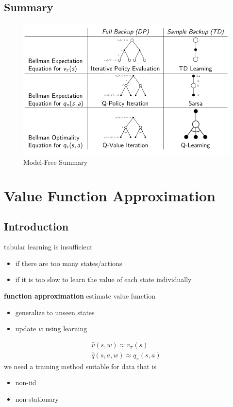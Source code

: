 \documentclass[]{article}
\theoremstyle{definition}
\begin{document}
\subsection{Summary}%
\label{sub:model_free_summary}

\begin{figure}[ht]
    \centering
    \includegraphics[width=0.7\linewidth]{model-free-summary.png}
    \caption{Model-Free Summary}
    \label{fig:model-free-summary}
\end{figure}

\section{Value Function Approximation}%
\label{sec:value_function_approximation}

\subsection{Introduction}%
\label{sub:vfa_introduction}
tabular learning is insufficient
\begin{itemize}
    \item if there are too many states/actions
    \item if it is too slow to learn the value of each state individually
\end{itemize}
\textbf{function approximation} estimate value function
\begin{itemize}
    \item generalize to unseen states
    \item update $w$ using learning
\end{itemize}
\begin{align*}
    \hat v(s,w) \approx v_\pi(s) \\
    \hat q(s, a, w) \approx q_\pi(s,a)
\end{align*}
we need a training method suitable for data that is
\begin{itemize}
    \item non-iid
    \item non-stationary
\end{itemize}
\end{document}
